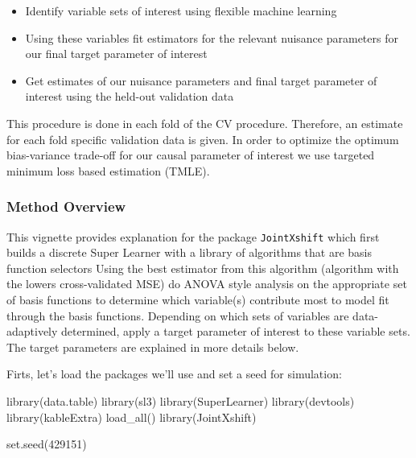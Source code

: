 \documentclass[
]{article}
\newenvironment{Shaded}{\begin{snugshade}}{\end{snugshade}}
\newcommand{\DecValTok}[1]{\textcolor[rgb]{0.00,0.00,0.81}{#1}}
\newcommand{\FunctionTok}[1]{\textcolor[rgb]{0.00,0.00,0.00}{#1}}
\newcommand{\NormalTok}[1]{#1}
\providecommand{\tightlist}{%
  \setlength{\itemsep}{0pt}\setlength{\parskip}{0pt}}
\begin{document}
\begin{itemize}
\tightlist
\item
  Identify variable sets of interest using flexible machine learning
\item
  Using these variables fit estimators for the relevant nuisance
  parameters for our final target parameter of interest
\item
  Get estimates of our nuisance parameters and final target parameter of
  interest using the held-out validation data
\end{itemize}

This procedure is done in each fold of the CV procedure. Therefore, an
estimate for each fold specific validation data is given. In order to
optimize the optimum bias-variance trade-off for our causal parameter of
interest we use targeted minimum loss based estimation (TMLE).

\hypertarget{method-overview}{%
\subsubsection{Method Overview}\label{method-overview}}

This vignette provides explanation for the package \texttt{JointXshift}
which first builds a discrete Super Learner with a library of algorithms
that are basis function selectors Using the best estimator from this
algorithm (algorithm with the lowers cross-validated MSE) do ANOVA style
analysis on the appropriate set of basis functions to determine which
variable(s) contribute most to model fit through the basis functions.
Depending on which sets of variables are data-adaptively determined,
apply a target parameter of interest to these variable sets. The target
parameters are explained in more details below.

Firts, let's load the packages we'll use and set a seed for simulation:

\begin{Shaded}
\begin{Highlighting}[]
\FunctionTok{library}\NormalTok{(data.table)}
\FunctionTok{library}\NormalTok{(sl3)}
\FunctionTok{library}\NormalTok{(SuperLearner)}
\FunctionTok{library}\NormalTok{(devtools)}
\FunctionTok{library}\NormalTok{(kableExtra)}
\FunctionTok{load\_all}\NormalTok{()}
\FunctionTok{library}\NormalTok{(JointXshift)}

\FunctionTok{set.seed}\NormalTok{(}\DecValTok{429151}\NormalTok{)}
\end{Highlighting}
\end{Shaded}
\end{document}

